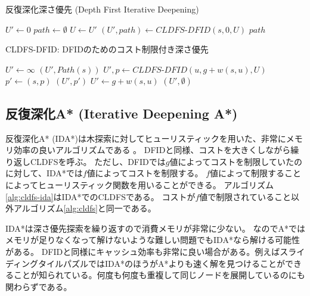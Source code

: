 \begin{algorithm}
\caption{反復深化深さ優先 (Depth First Iterative Deepening)}
\label{alg:depth-first-iterative-deepening}
        $U' \leftarrow 0$\;
        $path \leftarrow \emptyset$\;
         {
          $U \leftarrow U'$\;
          $(U', path) \leftarrow CLDFS\text{-}DFID(s, 0, U)$\;
        }
        \Return $path$\;
\end{algorithm}

\begin{algorithm}
\caption{CLDFS-DFID: DFIDのためのコスト制限付き深さ優先}
\label{alg:cldfs}
        $U' \leftarrow \infty$\;
	 {
		\Return $(U', Path(s))$\;
	}
	 {
		 {
			$U', p \leftarrow CLDFS\text{-}DFID(u, g + w(s, u), U)$\;
		   {
                    $p' \leftarrow (s, p)$\;
		    \Return $(U', p')$\;
		  }
		}
                 {
                  $U' \leftarrow g + w(s, u)$\;
                }
	}
	\Return $(U', \emptyset)$\;
\end{algorithm}


\subsection{反復深化A* (Iterative Deepening A*)}
\label{sec:iterative-deepening-astar}


反復深化A* (IDA*)は木探索に対してヒューリスティックを用いた、非常にメモリ効率の良いアルゴリズムである \cite{korf:85a}。
DFIDと同様、コストを大きくしながら繰り返しCLDFSを呼ぶ。
ただし、DFIDでは$g$値によってコストを制限していたのに対して、IDA*では$f$値によってコストを制限する。
$f$値によって制限することによってヒューリスティック関数を用いることができる。
アルゴリズム\ref{alg:cldfs-ida}はIDA*でのCLDFSである。
コストが$f$値で制限されていること以外アルゴリズム\ref{alg:cldfs}と同一である。

IDA*は深さ優先探索を繰り返すので消費メモリが非常に少ない。
なのでA*ではメモリが足りなくなって解けないような難しい問題でもIDA*なら解ける可能性がある。
DFIDと同様にキャッシュ効率も非常に良い場合がある。例えばスライディングタイルパズルではIDA*のほうがA*よりも速く解を見つけることができることが知られている\cite{korf:85a}。何度も何度も重複して同じノードを展開しているのにも関わらずである。

